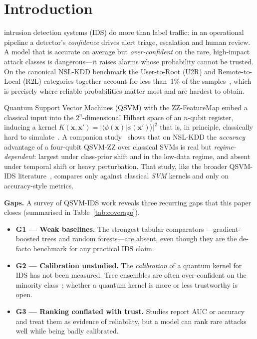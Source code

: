 \documentclass[journal]{IEEEtran}
\newcommand{\ZZ}{\textsc{ZZ}}
\newcommand{\QSVM}{QSVM-\ZZ}
\begin{document}
\section{Introduction}
 intrusion detection systems (IDS) do more than
label traffic: in an operational pipeline a detector's \emph{confidence}
drives alert triage, escalation and human review. A model that is
accurate on average but \emph{over-confident} on the rare, high-impact
attack classes is dangerous---it raises alarms whose probability cannot
be trusted. On the canonical NSL-KDD benchmark the User-to-Root (U2R) and
Remote-to-Local (R2L) categories together account for less than~1\% of
the samples~\cite{tavallaee2009nslkdd}, which is precisely where reliable
probabilities matter most and are hardest to obtain.

Quantum Support Vector Machines (QSVM) with the \ZZ{}-FeatureMap embed a
classical input into the $2^{n}$-dimensional Hilbert space of an
$n$-qubit register, inducing a kernel $K(\mathbf{x},\mathbf{x}')=
|\langle\phi(\mathbf{x})|\phi(\mathbf{x}')\rangle|^2$ that is, in
principle, classically hard to
simulate~\cite{havlicek2019,schuld2019hilbert,liu2021speedup}. A
companion study~\cite{companion} shows that on NSL-KDD the \emph{accuracy}
advantage of a four-qubit \QSVM{} over classical SVMs is real but
\emph{regime-dependent}: largest under class-prior shift and in the
low-data regime, and absent under temporal shift or heavy perturbation.
That study, like the broader QSVM-IDS
literature~\cite{kalinin2023qids,suryotrisongko2022dga,payares2021dos},
compares only against classical \emph{SVM} kernels and only on
accuracy-style metrics.

\textbf{Gaps.} A survey of QSVM-IDS work reveals three recurring gaps
that this paper closes (summarised in Table~\ref{tab:coverage}).
\begin{itemize}
\item \textbf{G1 --- Weak baselines.} The strongest tabular comparators
  ---gradient-boosted trees and random forests---are absent, even though
  they are the de-facto benchmark for any practical IDS claim.
\item \textbf{G2 --- Calibration unstudied.} The \emph{calibration} of a
  quantum kernel for IDS has not been measured. Tree ensembles are often
  over-confident on the minority class~\cite{guo2017calibration}; whether
  a quantum kernel is more or less trustworthy is open.
\item \textbf{G3 --- Ranking conflated with trust.} Studies report AUC or
  accuracy and treat them as evidence of reliability, but a model can
  rank rare attacks well while being badly calibrated.
\end{itemize}
\end{document}
